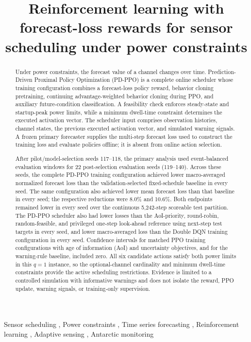 \documentclass[review,authoryear,12pt]{elsarticle}
\newif\ifanonymoussubmission
\begin{document}
\begin{frontmatter}

\title{Reinforcement learning with forecast-loss rewards for sensor scheduling under power constraints}

\ifanonymoussubmission
\else
  
\fi

\begin{abstract}
Under power constraints, the forecast value of a channel changes over time. Prediction-Driven Proximal Policy Optimization (PD-PPO) is a complete online scheduler whose training configuration combines a forecast-loss policy reward, behavior cloning pretraining, continuing advantage-weighted behavior cloning during PPO, and auxiliary future-condition classification. A feasibility check enforces steady-state and startup-peak power limits, while a minimum dwell-time constraint determines the executed activation vector. The scheduler input comprises observation histories, channel states, the previous executed activation vector, and simulated warning signals. A frozen primary forecaster supplies the multi-step forecast loss used to construct the training loss and evaluate policies offline; it is absent from online action selection.

After pilot/model-selection seeds 117--118, the primary analysis used event-balanced evaluation windows for 22 post-selection evaluation seeds (119--140). Across these seeds, the complete PD-PPO training configuration achieved lower macro-averaged normalized forecast loss than the validation-selected fixed-schedule baseline in every seed. The same configuration also achieved lower mean forecast loss than that baseline in every seed; the respective reductions were 8.0\% and 10.6\%. Both endpoints remained lower in every seed over the continuous 5,242-step scoreable test partition. The PD-PPO scheduler also had lower losses than the AoI-priority, round-robin, random-feasible, and privileged one-step look-ahead reference using next-step test targets in every seed, and lower macro-averaged loss than the Double DQN training configuration in every seed. Confidence intervals for matched PPO training configurations with age of information (AoI) and uncertainty objectives, and for the warning-rule baseline, included zero. All six candidate actions satisfy both power limits in this $q=1$ instance, so the optional-channel cardinality and minimum dwell-time constraints provide the active scheduling restrictions. Evidence is limited to a controlled simulation with informative warnings and does not isolate the reward, PPO update, warning signals, or training-only supervision.
\end{abstract}

\begin{keyword}
Sensor scheduling \sep
Power constraints \sep
Time series forecasting \sep
Reinforcement learning \sep
Adaptive sensing \sep
Antarctic monitoring
\end{keyword}

\end{frontmatter}
\end{document}
